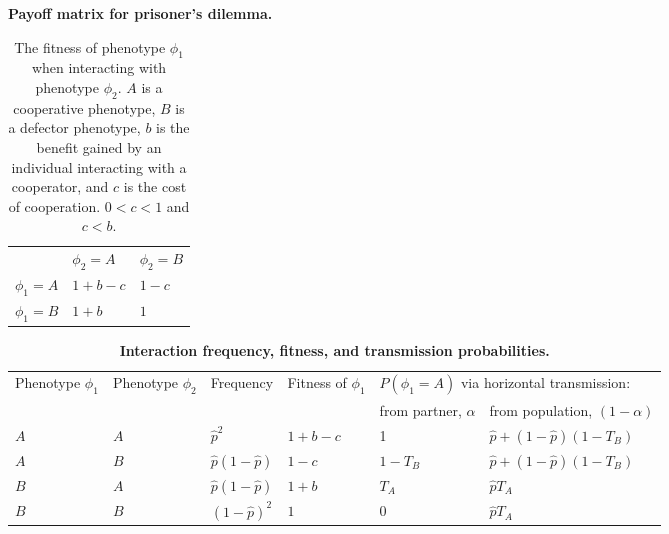 \documentclass[12pt]{extarticle}
\begin{document}
\bigskip
\begin{table}[h]
\centering
\caption{\textbf{Payoff matrix for prisoner's dilemma.}}
\begin{tabular}{lll}
\toprule
           & $\phi_2=A$ & $\phi_2=B$ \\ \cmidrule(r){1-3}
$\phi_1=A$ & $1+b-c$ & $1-c$ \\
$\phi_1=B$ & $1+b$   & $1$
\\ \bottomrule
\end{tabular}
\label{table:prisoner_payoff}
\caption*{
The fitness of phenotype $\phi_1$ when interacting with phenotype $\phi_2$. $A$ is a cooperative phenotype, $B$ is a defector phenotype, $b$ is the benefit gained by an individual interacting with a cooperator, and $c$ is the cost of cooperation. $0<c<1$ and $c<b$.
}
\end{table}
\bigskip

 
\bigskip
\begin{table}[h]
\caption{\textbf{Interaction frequency, fitness, and transmission probabilities.}}
\begin{tabular}{@{}llllll@{}}
\toprule
\multirow{2}{*}{Phenotype $\phi_1$} &
  \multirow{2}{*}{Phenotype $\phi_2$} &
  \multirow{2}{*}{Frequency} &
  \multirow{2}{*}{Fitness of $\phi_1$} &
  \multicolumn{2}{l}{$P(\phi_1=A)$ via horizontal transmission:} \\ \cmidrule(l){5-6} 
    &     &                      &         & from partner, $\alpha$ & from population, $(1-\alpha)$ \\ \cmidrule(r){1-6}
$A$ & $A$ & $\hat{p}^2$          & $1+b-c$ & 1                      & $\hat{p}+(1-\hat{p})(1-T_B)$  \\
$A$ & $B$ & $\hat{p}(1-\hat{p})$ & $1-c$   & $1-T_B$                & $\hat{p}+(1-\hat{p})(1-T_B)$  \\
$B$ & $A$ & $\hat{p}(1-\hat{p})$ & $1+b$   & $T_A$                  & $\hat{p} T_A$                 \\
$B$ & $B$ & $(1-\hat{p})^2$      & $1$     & $0$                    & $\hat{p} T_A$                 \\ \bottomrule
\end{tabular}
\label{table:interactions}
\end{table}
\bigskip
\end{document}
